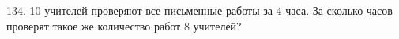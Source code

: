 134. 10 учителей проверяют все письменные работы за 4 часа. За сколько часов проверят такое же количество работ 8 учителей?\\
